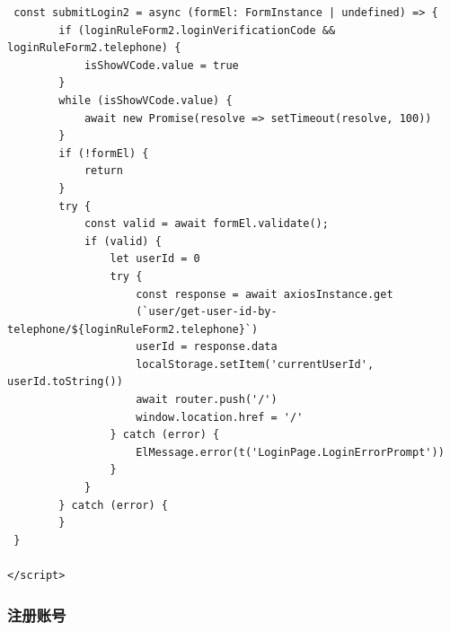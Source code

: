 \begin{itemize}
\begin{verbatim}
 const submitLogin2 = async (formEl: FormInstance | undefined) => {
    	if (loginRuleForm2.loginVerificationCode && loginRuleForm2.telephone) {
    		isShowVCode.value = true
    	}
    	while (isShowVCode.value) {
    		await new Promise(resolve => setTimeout(resolve, 100))
    	}
    	if (!formEl) {
    		return
    	}
    	try {
    		const valid = await formEl.validate();
    		if (valid) {
    			let userId = 0
    			try {
    				const response = await axiosInstance.get
    				(`user/get-user-id-by-telephone/${loginRuleForm2.telephone}`)
    				userId = response.data
    				localStorage.setItem('currentUserId', userId.toString())
    				await router.push('/')
    				window.location.href = '/'
    			} catch (error) {
    				ElMessage.error(t('LoginPage.LoginErrorPrompt'))
    			}
    		}
    	} catch (error) {
    	}
 }

</script>
	\end{verbatim}

\end{itemize}

\subsubsection{注册账号}

